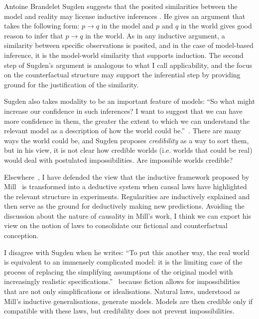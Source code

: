 \begin{artengenv}{Antoine Brandelet}
Sugden suggests that the posited similarities between the model and reality may license inductive inferences \parencites[see e.g.][]{Sugden2000}[p.240]{Sugden2013}. He gives an argument that takes the following form: $p\rightarrow q$ in the model and $p$ and $q$ in the world gives good reason to infer that $p\rightarrow q$ in the world. As in any inductive argument, a similarity between specific observations is posited, and in the case of model-based inference, it is the model-world similarity that supports induction. The second step of Sugden's argument is analogous to what I call applicability, and the focus on the counterfactual structure may support the inferential step by providing ground for the justification of the similarity.

Sugden also takes modality to be an important feature of models: ``So what might increase our confidence in such inferences? I want to suggest that we can have more confidence in them, the greater the extent to which we can understand the relevant model as a description of how the world could be.''~\parencite[p.24]{Sugden2000}. There are many ways the world could be, and Sugden proposes \textit{credibility} as a way to sort them, but in his view, it is not clear how credible worlds (i.e. worlds that could be real) would deal with postulated impossibilities. Are impossible worlds credible?

Elsewhere~\parencite{author2021}, I have defended the view that the inductive framework proposed by Mill~\parencite{Mill1843eng} is transformed into a deductive system when causal laws have highlighted the relevant structure in experiments. Regularities are inductively explained and then serve as the ground for deductively making new predictions. Avoiding the discussion about the nature of causality in Mill's work, I think we can export his view on the notion of laws to consolidate our fictional and counterfactual conception.

I disagree with Sugden when he writes: ``To put this another way, the real world is equivalent to an immensely complicated model: it is the limiting case of the process of replacing the simplifying assumptions of the original model with increasingly realistic specifications.''~\parencite[p.~23]{Sugden2000} because fiction allows for impossibilities that are not only simplifications or idealisations. Natural laws, understood as Mill's inductive generalisations, generate models. Models are then credible only if compatible with these laws, but credibility does not prevent impossibilities.


\end{artengenv}
